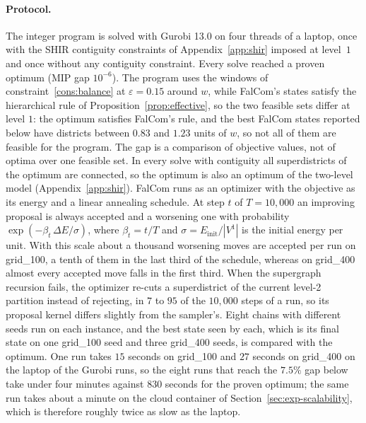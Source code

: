 \documentclass[preprint,12pt,authoryear]{elsarticle}
\theoremstyle{definition}
\begin{document}
\paragraph{Protocol.}
The integer program is solved with Gurobi 13.0 on four threads of a laptop, once with the SHIR contiguity constraints of Appendix~\ref{app:shir} imposed at level~$1$ and once without any contiguity constraint. Every solve reached a proven optimum (MIP gap $10^{-6}$). The program uses the windows of constraint~\eqref{cons:balance} at $\varepsilon = 0.15$ around $w$, while FalCom's states satisfy the hierarchical rule of Proposition~\ref{prop:effective}, so the two feasible sets differ at level $1$: the optimum satisfies FalCom's rule, and the best FalCom states reported below have districts between $0.83$ and $1.23$ units of $w$, so not all of them are feasible for the program. The gap is a comparison of objective values, not of optima over one feasible set. In every solve with contiguity all superdistricts of the optimum are connected, so the optimum is also an optimum of the two-level model (Appendix~\ref{app:shir}). FalCom runs as an optimizer with the objective as its energy and a linear annealing schedule. At step $t$ of $T = 10{,}000$ an improving proposal is always accepted and a worsening one with probability $\exp(-\beta_t\,\Delta E/\sigma)$, where $\beta_t = t/T$ and $\sigma = E_{\mathrm{init}}/|V^1|$ is the initial energy per unit. With this scale about a thousand worsening moves are accepted per run on grid\_100, a tenth of them in the last third of the schedule, whereas on grid\_400 almost every accepted move falls in the first third. When the supergraph recursion fails, the optimizer re-cuts a superdistrict of the current level-2 partition instead of rejecting, in $7$ to $95$ of the $10{,}000$ steps of a run, so its proposal kernel differs slightly from the sampler's. Eight chains with different seeds run on each instance, and the best state seen by each, which is its final state on one grid\_100 seed and three grid\_400 seeds, is compared with the optimum. One run takes $15$ seconds on grid\_100 and $27$ seconds on grid\_400 on the laptop of the Gurobi runs, so the eight runs that reach the $7.5\%$ gap below take under four minutes against $830$ seconds for the proven optimum; the same run takes about a minute on the cloud container of Section~\ref{sec:exp-scalability}, which is therefore roughly twice as slow as the laptop.
\end{document}
